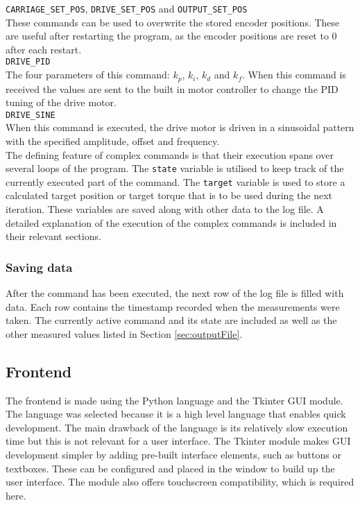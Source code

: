 \documentclass[12pt]{article}
\begin{document}
\verb|CARRIAGE_SET_POS|, \verb|DRIVE_SET_POS| and \verb|OUTPUT_SET_POS|\\

These commands can be used to overwrite the stored encoder positions. These are useful after restarting the program, as the encoder positions are reset to 0 after each restart.\\

\verb|DRIVE_PID|\\
The four parameters of this command: $k_p$, $k_i$, $k_d$ and $k_f$. When this command is received the values are sent to the built in motor controller to change the PID tuning of the drive motor.\\

\verb|DRIVE_SINE|\\
When this command is executed, the drive motor is driven in a sinusoidal pattern with the specified amplitude, offset and frequency.\\

The defining feature of complex commands is that their execution spans over several loops of the program. The \verb|state| variable is utilised to keep track of the currently executed part of the command. The \verb|target| variable is used to store a calculated target position or target torque that is to be used during the next iteration. These variables are saved along with other data to the log file. A detailed explanation of the execution of the complex commands is included in their relevant sections.
 


\subsubsection{Saving data}
After the command has been executed, the next row of the log file is filled with data. Each row contains the timestamp recorded when the measurements were taken. The currently active command and its state are included as well as the other measured values listed in Section \ref{sec:outputFile}. 


\subsection{Frontend}
The frontend is made using the Python language and the Tkinter GUI module. The language was selected because it is a high level language that enables quick development. The main drawback of the language is its relatively slow execution time but this is not relevant for a user interface. The Tkinter module makes GUI development simpler by adding pre-built interface elements, such as buttons or textboxes. These can be configured and placed in the window to build up the user interface. The module also offers touchscreen compatibility, which is required here. 
\end{document}

